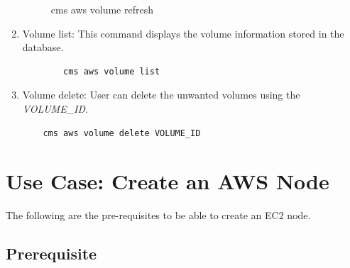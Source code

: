 \documentclass[9pt,twocolumn,twoside]{../../styles/osajnl}
\begin{document}
\begin{enumerate}
    \begin{figure}[h!]
    	\centering
    	\caption{cms aws volume refresh}
    	\label{fig:volumelist}
    \end{figure}
    
    \item Volume list: This command displays the volume information stored in the database.
        
        \begin{verbatim}
        cms aws volume list
        \end{verbatim}
        
    \item Volume delete: User can delete the unwanted volumes using the \textit{VOLUME\_ID}.
    
    \begin{verbatim}
    cms aws volume delete VOLUME_ID
    \end{verbatim}
    
\end{enumerate}

\section{Use Case: Create an AWS Node}
	The following are the pre-requisites to be able to create an EC2 node.

\subsection{Prerequisite}
\end{document}
